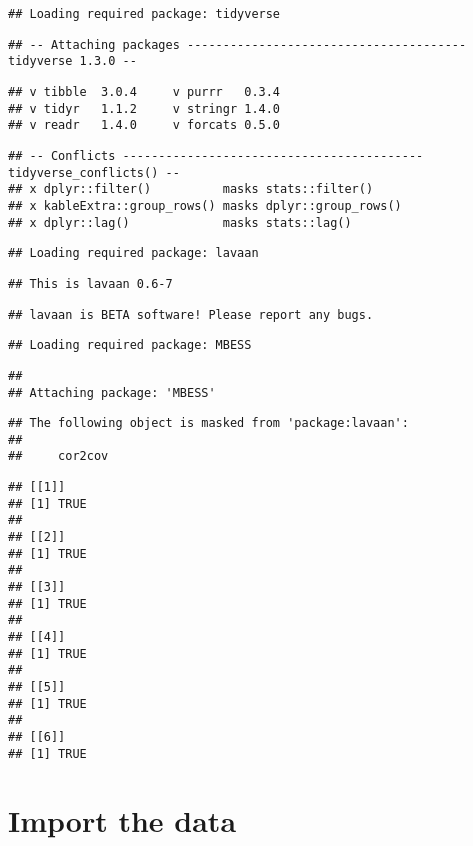\documentclass[
]{article}
\begin{document}
\begin{verbatim}
## Loading required package: tidyverse
\end{verbatim}

\begin{verbatim}
## -- Attaching packages --------------------------------------- tidyverse 1.3.0 --
\end{verbatim}

\begin{verbatim}
## v tibble  3.0.4     v purrr   0.3.4
## v tidyr   1.1.2     v stringr 1.4.0
## v readr   1.4.0     v forcats 0.5.0
\end{verbatim}

\begin{verbatim}
## -- Conflicts ------------------------------------------ tidyverse_conflicts() --
## x dplyr::filter()          masks stats::filter()
## x kableExtra::group_rows() masks dplyr::group_rows()
## x dplyr::lag()             masks stats::lag()
\end{verbatim}

\begin{verbatim}
## Loading required package: lavaan
\end{verbatim}

\begin{verbatim}
## This is lavaan 0.6-7
\end{verbatim}

\begin{verbatim}
## lavaan is BETA software! Please report any bugs.
\end{verbatim}

\begin{verbatim}
## Loading required package: MBESS
\end{verbatim}

\begin{verbatim}
## 
## Attaching package: 'MBESS'
\end{verbatim}

\begin{verbatim}
## The following object is masked from 'package:lavaan':
## 
##     cor2cov
\end{verbatim}

\begin{verbatim}
## [[1]]
## [1] TRUE
## 
## [[2]]
## [1] TRUE
## 
## [[3]]
## [1] TRUE
## 
## [[4]]
## [1] TRUE
## 
## [[5]]
## [1] TRUE
## 
## [[6]]
## [1] TRUE
\end{verbatim}

\hypertarget{import-the-data}{%
\section{Import the data}\label{import-the-data}}
\end{document}
